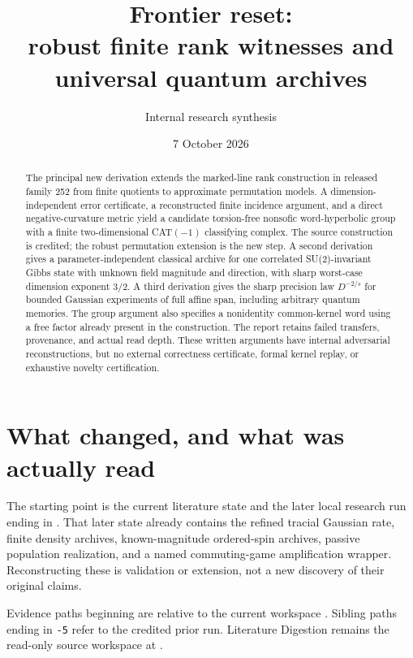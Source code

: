 \documentclass[11pt]{article}
\title{Frontier reset:\\robust finite rank witnesses and universal quantum archives}
\author{Internal research synthesis}
\date{7 October 2026}
\theoremstyle{definition}
\begin{document}
\maketitle
\begin{abstract}
The principal new derivation extends the marked-line rank construction in
released family 252 from finite quotients to approximate permutation
models. A dimension-independent error certificate, a reconstructed finite
incidence argument, and a direct negative-curvature metric yield a
candidate torsion-free nonsofic word-hyperbolic group with a finite
two-dimensional CAT$(-1)$ classifying complex. The source construction is
credited; the robust permutation extension is the new step. A second
derivation gives a parameter-independent classical archive for one
correlated SU(2)-invariant Gibbs state with unknown field magnitude and
direction, with sharp worst-case dimension exponent $3/2$. A third
derivation gives the sharp precision law $D^{-2/s}$ for bounded Gaussian
experiments of full affine span, including arbitrary quantum memories.
The group argument also specifies a nonidentity common-kernel word
using a free factor already present in the construction.
The report retains failed transfers, provenance, and actual read depth.
These written arguments have internal adversarial reconstructions, but
no external correctness certificate, formal kernel replay, or exhaustive
novelty certification.
\end{abstract}
\tableofcontents

\section{What changed, and what was actually read}\label{sec:scope}
The starting point is the current literature state and the later local
research run ending in . That later
state already contains the refined tracial Gaussian rate, finite
density archives, known-magnitude ordered-spin archives, passive
population realization, and a named commuting-game amplification wrapper.
Reconstructing these is validation or extension, not a new discovery of
their original claims.

Evidence paths beginning  are relative to the current
workspace
.
Sibling paths ending in \texttt{-5} refer to the credited prior run.
Literature Digestion remains the read-only source workspace at
.
\end{document}
